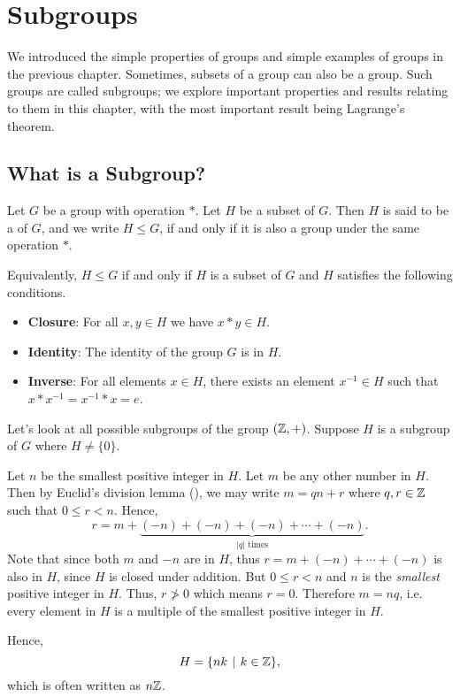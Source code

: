 \chapter{Subgroups}
We introduced the simple properties of groups and simple examples of groups in the previous chapter. Sometimes, subsets of a group can also be a group. Such groups are called subgroups; we explore important properties and results relating to them in this chapter, with the most important result being Lagrange's theorem.

\section{What is a Subgroup?}
\begin{definition}
    Let $G$ be a group with operation $\ast$. Let $H$ be a subset of $G$. Then $H$ is said to be a  of $G$, and we write $H \leq G$, if and only if it is also a group under the same operation $\ast$.
\end{definition}
\begin{remark}
    Equivalently, $H \leq G$ if and only if $H$ is a subset of $G$ and $H$ satisfies the following conditions.
    \begin{itemize}
        \item \textbf{Closure}: For all $x, y \in H$ we have $x \ast y \in H$.
        \item \textbf{Identity}: The identity of the group $G$ is in $H$.
        \item \textbf{Inverse}: For all elements $x \in H$, there exists an element $x^{-1} \in H$ such that $x \ast x^{-1} = x^{-1} \ast x = e$.
    \end{itemize}
\end{remark}

\begin{example}\label{example-subgroups-of-Z}
    Let's look at all possible subgroups of the group $(\mathbb{Z}, +)$. Suppose $H$ is a subgroup of $G$ where $H \neq \{0\}$.

    Let $n$ be the smallest positive integer in $H$. Let $m$ be any other number in $H$. Then by Euclid's division lemma (), we may write $m = qn + r$ where $q, r \in \mathbb{Z}$ such that $0 \leq r < n$. Hence,
    \[
        r = m + \underbrace{(-n) +(-n) +(-n) + \cdots + (-n)}_{|q| \text{ times}}.
    \]
    Note that since both $m$ and $-n$ are in $H$, thus $r = m + (-n) + \cdots + (-n)$ is also in $H$, since $H$ is closed under addition. But $0 \leq r < n$ and $n$ is the \textit{smallest} positive integer in $H$. Thus, $r \not> 0$ which means $r = 0$. Therefore $m = nq$, i.e. every element in $H$ is a multiple of the smallest positive integer in $H$.

    Hence,
    \[
        H = \{nk \vert k \in \Z\},
    \]
    which is often written as $n\mathbb{Z}$.
\end{example}

